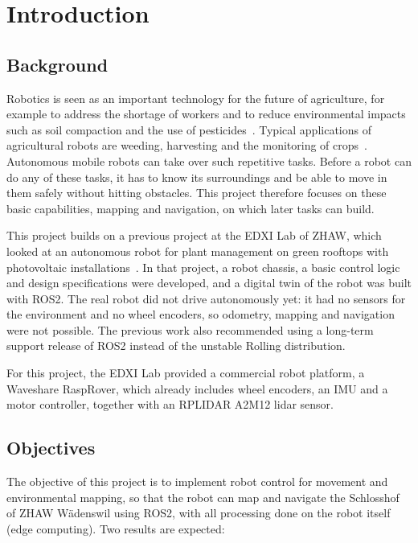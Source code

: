 \chapter{Introduction}
\label{ch:introduction}

\section{Background}

Robotics is seen as an important technology for the future of agriculture, for example to address the shortage of workers and to reduce environmental impacts such as soil compaction and the use of pesticides~\citep{duckett2018}. Typical applications of agricultural robots are weeding, harvesting and the monitoring of crops~\citep{oliveira2021}. Autonomous mobile robots can take over such repetitive tasks. Before a robot can do any of these tasks, it has to know its surroundings and be able to move in them safely without hitting obstacles. This project therefore focuses on these basic capabilities, mapping and navigation, on which later tasks can build.

This project builds on a previous project at the EDXI Lab of ZHAW, which looked at an autonomous robot for plant management on green rooftops with photovoltaic installations~\citep{graham2024}. In that project, a robot chassis, a basic control logic and design specifications were developed, and a digital twin of the robot was built with ROS2. The real robot did not drive autonomously yet: it had no sensors for the environment and no wheel encoders, so odometry, mapping and navigation were not possible. The previous work also recommended using a long-term support release of ROS2 instead of the unstable Rolling distribution.

For this project, the EDXI Lab provided a commercial robot platform, a Waveshare RaspRover, which already includes wheel encoders, an IMU and a motor controller, together with an RPLIDAR A2M12 lidar sensor.

\section{Objectives}

The objective of this project is to implement robot control for movement and environmental mapping, so that the robot can map and navigate the Schlosshof of ZHAW Wädenswil using ROS2, with all processing done on the robot itself (edge computing). Two results are expected:

